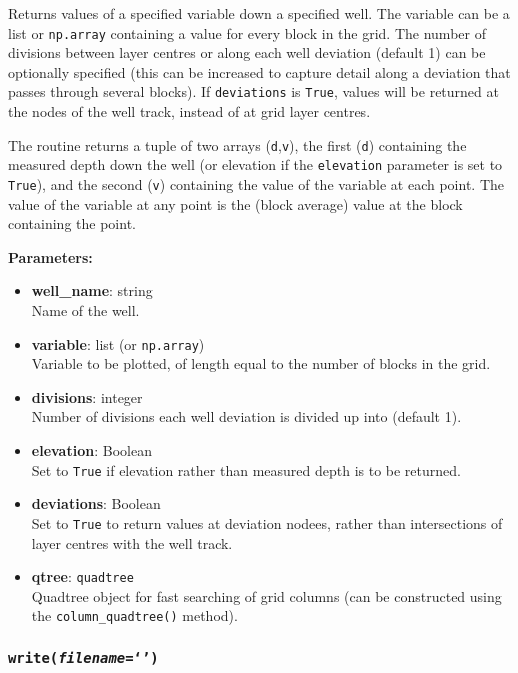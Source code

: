 Returns values of a specified variable down a specified well.  The variable can be a list or \texttt{np.array} containing a value for every block in the grid.  The number of divisions between layer centres or along each well deviation (default 1) can be optionally specified (this can be increased to capture detail along a deviation that passes through several blocks).  If \texttt{deviations} is \texttt{True}, values will be returned at the nodes of the well track, instead of at grid layer centres.

The routine returns a tuple of two arrays (\texttt{d},\texttt{v}), the first (\texttt{d}) containing the measured depth down the well (or elevation if the \texttt{elevation} parameter is set to \texttt{True}), and the second (\texttt{v}) containing the value of the variable at each point.  The value of the variable at any point is the (block average) value at the block containing the point.

\textbf{Parameters:}
\begin{itemize}
\item \textbf{well\_name}: string\\
  Name of the well.
\item \textbf{variable}: list (or \texttt{np.array})\\
  Variable to be plotted, of length equal to the number of blocks in the grid.
\item \textbf{divisions}: integer\\
  Number of divisions each well deviation is divided up into (default 1).
\item \textbf{elevation}: Boolean\\
  Set to \texttt{True} if elevation rather than measured depth is to be returned.
\item \textbf{deviations}: Boolean\\
  Set to \texttt{True} to return values at deviation nodees, rather than intersections of layer centres with the well track.
\item \textbf{qtree}: \texttt{quadtree}\\
  Quadtree object for fast searching of grid columns (can be constructed using the \texttt{column\_quadtree()} method).
\end{itemize}

\subsubsection{\texttt{write(\emph{filename}=`')}}

